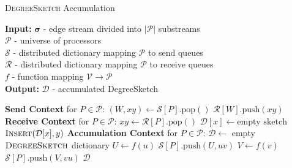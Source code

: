 \documentclass[10]{article}
\newcommand{\push}[1]{\text{push} \left ( #1 \right )}
\newcommand{\pop}{\text{pop}()}
\newcommand{\algoname}[1]{\textnormal{\textsc{#1}}}
\begin{document}
\begin{algorithm}[htbp] 
\caption{\algoname{DegreeSketch} Accumulation}\label{alg:ds:accumulation}
\begin{flushleft}
        \textbf{Input:} 		$\boldsymbol{\sigma}$ - edge stream divided into $|\mathcal{P}|$ substreams\\
        	\hspace{3.2em}	$\mathcal{P}$ - universe of processors	 \\
        	\hspace{3.2em}	$\mathcal{S}$ - distributed dictionary mapping $\mathcal{P}$ to send queues	 \\
        	\hspace{3.2em}	$\mathcal{R}$ - distributed dictionary mapping $\mathcal{P}$ to receive queues	 \\
        	\hspace{3.2em}	$f$ - function mapping $\mathcal{V} \rightarrow \mathcal{P}$	 \\
        \textbf{Output:} $\mathcal{D}$ - accumulated DegreeSketch
\end{flushleft}
\begin{flushleft}
\begin{algorithmic}[1]
	\Statex \textbf{Send Context} for $P \in \mathcal{P}$:
  			\State $(W, xy) \gets \mathcal{S}[P].\pop$
			\State $\mathcal{R}[W].\push{xy}$
  		\EndWhile
	\Statex \textbf{Receive Context} for $P \in \mathcal{P}$:
  			\State $xy \gets \mathcal{R}[P].\pop$
				\State $\mathcal{D}[x] \gets \text{empty sketch}$
			\EndIf
	  		\State $\algoname{Insert}(\mathcal{D}[x], y)$
  		\EndWhile
	\Statex \textbf{Accumulation Context} for $P \in \mathcal{P}$:
		\State $\mathcal{D} \gets $ empty $\algoname{DegreeSketch}$ dictionary
			\State $U \gets f(u)$
 			\State $\mathcal{S}[P].\push{U, uv}$
			\State $V \gets f(v)$
 			\State $\mathcal{S}[P].\push{V, vu}$
		\EndWhile
		\State \Return $\mathcal{D}$
\end{algorithmic}
\end{flushleft}
\end{algorithm}
\end{document}
